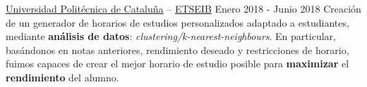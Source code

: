 \documentclass[10pt, a4paper, ragged2e]{../altacv}
\begin{document}
\divider

{\href{https://upc.edu}{Universidad Politécnica de Cataluña} --
\href{https://etseib.upc.edu}{ETSEIB}}
{Enero 2018 - Junio 2018}{}
Creación de un generador de horarios de estudios personalizados adaptado a
estudiantes, mediante \textbf{análisis de
  datos}: \textit{clustering/k-nearest-neighbours}. En particular, basándonos en
notas anteriores, rendimiento deseado y restricciones de horario, fuimos capaces
de crear el mejor horario de estudio posible para \textbf{maximizar} el
\textbf{rendimiento} del alumno.


\medskip


\end{document}

